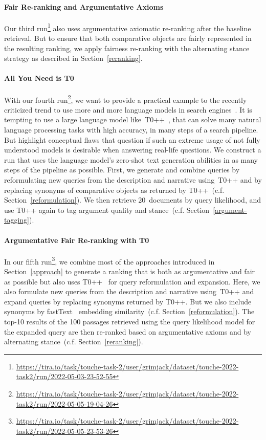 \paragraph{Fair Re-ranking and Argumentative Axioms}

Our third run\footnote{\url{https://tira.io/task/touche-task-2/user/grimjack/dataset/touche-2022-task2/run/2022-05-03-23-52-55}} also uses argumentative axiomatic re-ranking after the baseline retrieval. But to ensure that both comparative objects are fairly represented in the resulting ranking, we apply fairness re-ranking with the alternating stance strategy as described in Section~\ref{reranking}.

\paragraph{All You Need is T0}

With our fourth run\footnote{\url{https://tira.io/task/touche-task-2/user/grimjack/dataset/touche-2022-task2/run/2022-05-05-19-04-26}}, we want to provide a practical example to the recently criticized trend to use more and more language models in search engines~\cite{ShahB2022}.
It is tempting to use a large language model like~T0++~\cite{SanhWRBSACSLRDBXTSSKCNDCJWMSYPBWNRSSFFTBGBWR2021}, that can solve many natural language processing tasks with high accuracy, in many steps of a search pipeline. But \citet{ShahB2022} highlight conceptual flaws that question if such an extreme usage of not fully understood models is desirable when answering real-life questions.
We construct a run that uses the language model's zero-shot text generation abilities in as many steps of the pipeline as possible.
First, we generate and combine queries by reformulating new queries from the description and narrative using~T0++ and by replacing synonyms of comparative objects as returned by T0++~(c.f. Section~\ref{reformulation}).
We then retrieve 20~documents by query likelihood, and use T0++ again to tag argument quality and stance~(c.f. Section~\ref{argument-tagging}).

\paragraph{Argumentative Fair Re-ranking with T0}

In our fifth run\footnote{\url{https://tira.io/task/touche-task-2/user/grimjack/dataset/touche-2022-task2/run/2022-05-05-23-53-26}}, we combine most of the approaches introduced in Section~\ref{approach} to generate a ranking that is both as argumentative and fair as possible but also uses T0++~\cite{SanhWRBSACSLRDBXTSSKCNDCJWMSYPBWNRSSFFTBGBWR2021} for query reformulation and expansion.
Here, we also formulate new queries from the description and narrative using~T0++ and expand queries by replacing synonyms returned by T0++. But we also include synonyms by fastText~\cite{BojanowskiGJM2017} embedding similarity~(c.f. Section~\ref{reformulation}).
The top-10 results of the 100 passages retrieved using the query likelihood model for the expanded query are then re-ranked based on argumentative axioms and by alternating stance~(c.f. Section~\ref{reranking}).
